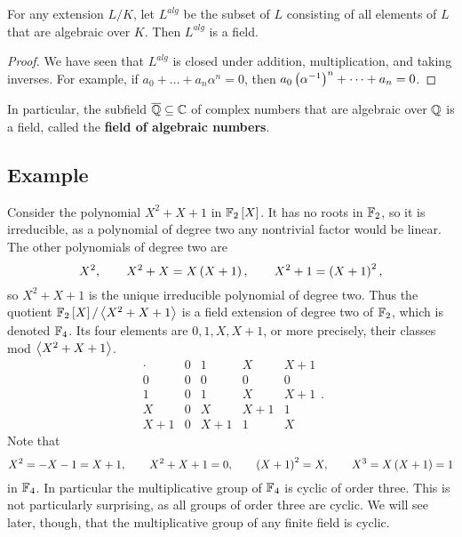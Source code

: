 \begin{corollary}
For any extension $ L / K $, let $ L^{alg} $ be the subset of $ L $ consisting of all elements of $ L $ that are algebraic over $ K $. Then $ L^{alg} $ is a field.
\end{corollary}

\begin{proof}
We have seen that $ L^{alg} $ is closed under addition, multiplication, and taking inverses. For example, if $ a_0 + \dots + a_n\alpha^n = 0 $, then $ a_0\left( \alpha^{-1} \right)^n + \dots + a_n = 0 $.
\end{proof}

\begin{example2}
In particular, the subfield $ \overline{\mathbb{Q}} \subseteq \mathbb{C} $ of complex numbers that are algebraic over $ \mathbb{Q} $ is a field, called the \textbf{field of algebraic numbers}.
\end{example2}

\subsection{Example}

\begin{example2}
Consider the polynomial $ X^2 + X + 1 $ in $ \mathbb{F}_2\left[ X \right] $. It has no roots in $ \mathbb{F}_2 $, so it is irreducible, as a polynomial of degree two any nontrivial factor would be linear. The other polynomials of degree two are
$$ X^2, \qquad X^2 + X = X\left( X + 1 \right), \qquad X^2 + 1 = \left( X + 1 \right)^2, $$
so $ X^2 + X + 1 $ is the unique irreducible polynomial of degree two. Thus the quotient $ \mathbb{F}_2\left[ X \right] / \left\langle X^2 + X + 1 \right\rangle $ is a field extension of degree two of $ \mathbb{F}_2 $, which is denoted $ \mathbb{F}_4 $. Its four elements are $ 0, 1, X, X + 1 $, or more precisely, their classes mod $ \left\langle X^2 + X + 1 \right\rangle $.
$$
\begin{array}{c|cccc}
\cdot & 0 & 1 & X & X + 1 \\
\hline
0 & 0 & 0 & 0 & 0 \\
1 & 0 & 1 & X & X + 1 \\
X & 0 & X & X + 1 & 1 \\
X + 1 & 0 & X + 1 & 1 & X
\end{array}.
$$
Note that
$$ X^2 = -X - 1 = X + 1, \qquad X^2 + X + 1 = 0, \qquad \left( X + 1 \right)^2 = X, \qquad X^3 = X\left( X + 1 \right) = 1 $$
in $ \mathbb{F}_4 $. In particular the multiplicative group of $ \mathbb{F}_4 $ is cyclic of order three. This is not particularly surprising, as all groups of order three are cyclic. We will see later, though, that the multiplicative group of any finite field is cyclic.
\end{example2}


